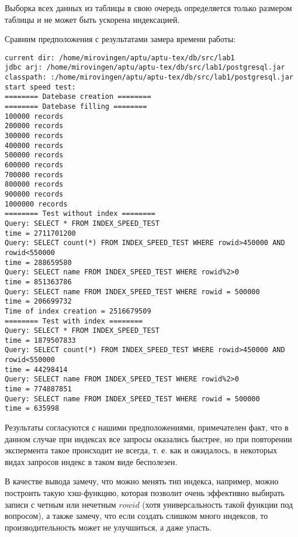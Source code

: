 \documentclass[a4paper,12pt]{article}
\begin{document}
Выборка всех данных из таблицы в свою очередь определяется только размером таблицы и не может быть ускорена индексацией.

Сравним предположения с результатами замера времени работы:
\begin{lstlisting}
current dir: /home/mirovingen/aptu/aptu-tex/db/src/lab1
jdbc arj: /home/mirovingen/aptu/aptu-tex/db/src/lab1/postgresql.jar
classpath: :/home/mirovingen/aptu/aptu-tex/db/src/lab1/postgresql.jar
start speed test:
======== Datebase creation ========
======== Datebase filling ========
100000 records
200000 records
300000 records
400000 records
500000 records
600000 records
700000 records
800000 records
900000 records
1000000 records
======== Test without index ========
Query: SELECT * FROM INDEX_SPEED_TEST
time = 2711701200
Query: SELECT count(*) FROM INDEX_SPEED_TEST WHERE rowid>450000 AND rowid<550000
time = 288659580
Query: SELECT name FROM INDEX_SPEED_TEST WHERE rowid%2>0
time = 851363786
Query: SELECT name FROM INDEX_SPEED_TEST WHERE rowid = 500000
time = 206699732
Time of index creation = 2516679509
======== Test with index ========
Query: SELECT * FROM INDEX_SPEED_TEST
time = 1879507833
Query: SELECT count(*) FROM INDEX_SPEED_TEST WHERE rowid>450000 AND rowid<550000
time = 44298414
Query: SELECT name FROM INDEX_SPEED_TEST WHERE rowid%2>0
time = 774887851
Query: SELECT name FROM INDEX_SPEED_TEST WHERE rowid = 500000
time = 635998
\end{lstlisting}

Результаты согласуются с нашими предположениями, примечателен факт, что в данном случае при индексах все запросы оказались быстрее,
но при повторении экспермента такое происходит не всегда, т. е. как и ожидалось, в некоторых видах запросов индекс в таком виде
бесполезен.

В качестве вывода замечу, что можно менять тип индекса, например, можно построить такую хэш-функцию, которая позволит очень эффективно
выбирать записи с четным или нечетным $rowid$ (хотя универсальность такой функции под вопросом), а также замечу, что если создать слишком
много индексов, то производительность может не улучшиться, а даже упасть.
\end{document}
